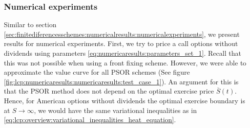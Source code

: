 \subsubsection{Numerical experiments}
Similar to section \eqref{sec:finitediferencesschemes:numericalresults:numericalexperiments}, we present results for numerical experiments. First, we try to price a call options without dividends using parameters \eqref{eq:numericaresults:parameters_set_1}. Recall that this was not possible when using a front fixing scheme. However, we were able to approximate the value curve for all PSOR schemes (See figure \eqref{fig:lcp:numericaresults:numericaresults:test_case_1}). An argument for this is that the PSOR method does not depend on the optimal exercise price $\bar{S}(t)$. Hence, for American options without dividends the optimal exercise boundary is at $S\rightarrow\infty$, we would have the same variational inequalities as in \eqref{eq:lcp:overview:variational_inequalities_heat_equation}.
